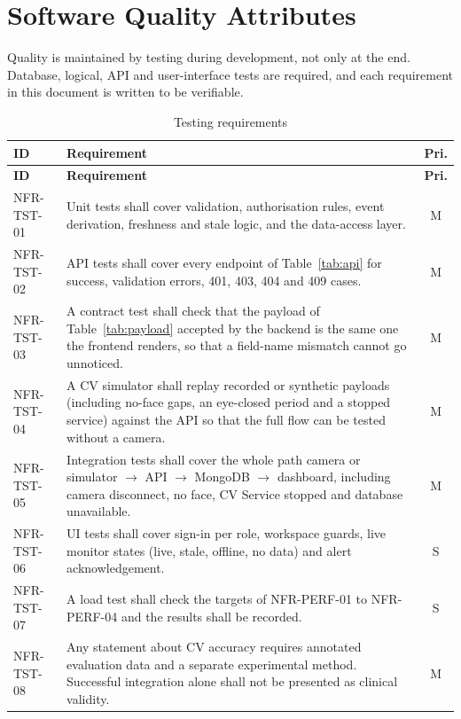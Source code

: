 \documentclass[a4paper,11pt]{scrreprt}
\makeatletter
\newenvironment{reqtable}[1]{%
  \small
  \begin{longtable}{@{}>{\ttfamily\footnotesize}p{2.55cm}>{\raggedright\arraybackslash}p{10.7cm}c@{}}
  \caption{#1}\\
  \toprule \textbf{ID} & \textbf{Requirement} & \textbf{Pri.}\\ \midrule
  \endfirsthead
  \toprule \textbf{ID} & \textbf{Requirement} & \textbf{Pri.}\\ \midrule
  \endhead
  \bottomrule
  \endfoot
}{%
  \end{longtable}\normalsize
}
\newcommand{\req}[3]{#1 & #2 & #3 \\ \midrule}
\makeatother
\begin{document}
\section{Software Quality Attributes}
Quality is maintained by testing during development, not only at the end. Database, logical, API and user-interface tests are required, and each requirement in this document is written to be verifiable.
\begin{reqtable}{Testing requirements}
\req{NFR-TST-01}{Unit tests shall cover validation, authorisation rules, event derivation, freshness and stale logic, and the data-access layer.}{M}
\req{NFR-TST-02}{API tests shall cover every endpoint of Table~\ref{tab:api} for success, validation errors, 401, 403, 404 and 409 cases.}{M}
\req{NFR-TST-03}{A contract test shall check that the payload of Table~\ref{tab:payload} accepted by the backend is the same one the frontend renders, so that a field-name mismatch cannot go unnoticed.}{M}
\req{NFR-TST-04}{A CV simulator shall replay recorded or synthetic payloads (including no-face gaps, an eye-closed period and a stopped service) against the API so that the full flow can be tested without a camera.}{M}
\req{NFR-TST-05}{Integration tests shall cover the whole path camera or simulator $\rightarrow$ API $\rightarrow$ MongoDB $\rightarrow$ dashboard, including camera disconnect, no face, CV Service stopped and database unavailable.}{M}
\req{NFR-TST-06}{UI tests shall cover sign-in per role, workspace guards, live monitor states (live, stale, offline, no data) and alert acknowledgement.}{S}
\req{NFR-TST-07}{A load test shall check the targets of NFR-PERF-01 to NFR-PERF-04 and the results shall be recorded.}{S}
\req{NFR-TST-08}{Any statement about CV accuracy requires annotated evaluation data and a separate experimental method. Successful integration alone shall not be presented as clinical validity.}{M}
\end{reqtable}
\end{document}
